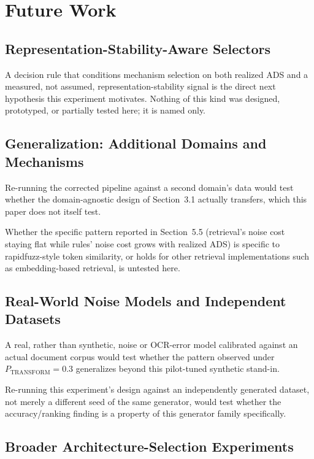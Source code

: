 \documentclass[11pt]{article}
\begin{document}
\section{Future Work}
\label{sec:future-work}

\subsection{Representation-Stability-Aware Selectors}
\label{sec:future-selectors}

A decision rule that conditions mechanism selection on both realized ADS and
a measured, not assumed, representation-stability signal is the direct next
hypothesis this experiment motivates. Nothing of this kind was designed,
prototyped, or partially tested here; it is named only.

\subsection{Generalization: Additional Domains and Mechanisms}
\label{sec:future-domains}

Re-running the corrected pipeline against a second domain's data would test
whether the domain-agnostic design of Section~3.1 actually transfers, which
this paper does not itself test.

Whether the specific pattern reported in Section~5.5 (retrieval's noise
cost staying flat while rules' noise cost grows with realized ADS) is
specific to rapidfuzz-style token similarity, or holds for other retrieval
implementations such as embedding-based retrieval, is untested here.

\subsection{Real-World Noise Models and Independent Datasets}
\label{sec:future-noise-models}

A real, rather than synthetic, noise or OCR-error model calibrated against an
actual document corpus would test whether the pattern observed under
$P_{\mathrm{TRANSFORM}}=0.3$ generalizes beyond this pilot-tuned synthetic
stand-in.

Re-running this experiment's design against an independently generated
dataset, not merely a different seed of the same generator, would test
whether the accuracy/ranking finding is a property of this generator family
specifically.

\subsection{Broader Architecture-Selection Experiments}
\label{sec:future-architecture-experiments}
\end{document}
